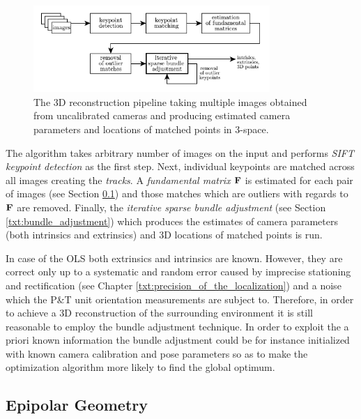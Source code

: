 \begin{figure}[tbh]
	\centering
	\includegraphics[width=0.8\textwidth]{fig/3d_reconstruction_pipeline.pdf}
	\caption{The 3D reconstruction pipeline taking multiple images obtained from uncalibrated cameras and producing estimated camera parameters and locations of matched points in 3-space.}
	\label{fig:3d_reconstruction_pipeline}
\end{figure}

The algorithm takes arbitrary number of images on the input and performs \textit{SIFT keypoint detection} as the first step. Next, individual keypoints are matched across all images creating the \textit{tracks}. A \textit{fundamental matrix $\mathbf{F}$} is estimated for each pair of images (see Section \ref{txt:epipolar_geometry}) and those matches which are outliers with regards to $\mathbf{F}$ are removed. Finally, the \textit{iterative sparse bundle adjustment} (see Section \ref{txt:bundle_adjustment}) which produces the estimates of camera parameters (both intrinsics and extrinsics) and 3D locations of matched points is run.

In case of the OLS both extrinsics and intrinsics are known. However, they are correct only up to a systematic and random error caused by imprecise stationing and rectification (see Chapter \ref{txt:precision_of_the_localization}) and a noise which the P\&T unit orientation measurements are subject to. Therefore, in order to achieve a 3D reconstruction of the surrounding environment it is still reasonable to employ the bundle adjustment technique. In order to exploit the a priori known information the bundle adjustment could be for instance initialized with known camera calibration and pose parameters so as to make the optimization algorithm more likely to find the global optimum.

\subsection{Epipolar Geometry} \label{txt:epipolar_geometry}

